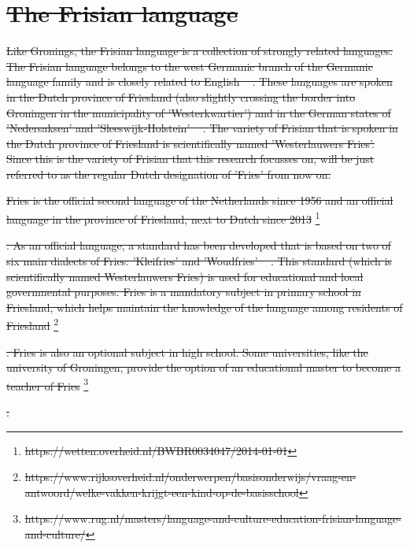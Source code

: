 \documentclass[
10pt, %
a4paper, %
oneside, %
headinclude,footinclude, %
] {book}%
\providecommand{\DIFdel}[1]{{\protect\color{red}\sout{#1}}}                      %
\begin{document}
\section{\DIFdel{The Frisian language}}
\addtocounter{section}{-1}%
\DIFdel{Like Gronings, the Frisian language is a collection of strongly related languages. The Frisian language belongs to the west Germanic branch of the Germanic language family and is closely related to English \mbox{%
\citep{streektalen}}\hspace{0pt}%
. These languages are spoken in the Dutch province of Friesland (also slightly crossing the border into Groningen in the municipality of 'Westerkwartier') and in the German states of 'Nedersaksen' and 'Sleeswijk-Holstein' \mbox{%
\citep{streektalen}}\hspace{0pt}%
. The variety of Frisian that is spoken in the Dutch province of Friesland is scientifically named 'Westerlauwers Fries'. Since this is the variety of Frisian that this research focusses on, will be just referred to as the regular Dutch designation of 'Fries' from now on. 
}%

\DIFdel{Fries is the official second language of the Netherlands since 1956 and an official language in the province of Friesland, next to Dutch since 2013 }\footnote{\DIFdel{https://wetten.overheid.nl/BWBR0034047/2014-01-01}}%
\addtocounter{footnote}{-1}%
\DIFdel{. As an official language, a standard has been developed that is based on two of six main dialects of Fries: 'Kleifries' and 'Woudfries' \mbox{%
\citep{streektalen}}\hspace{0pt}%
. This standard (which is scientifically named Westerlauwers Fries) is used for educational and local governmental purposes. Fries is a mandatory subject in primary school in Friesland, which helps maintain the knowledge of the language among residents of Friesland }\footnote{\DIFdel{https://www.rijksoverheid.nl/onderwerpen/basisonderwijs/vraag-en-antwoord/welke-vakken-krijgt-een-kind-op-de-basisschool}}%
\addtocounter{footnote}{-1}%
\DIFdel{. Fries is also an optional subject in high school. Some universities, like the university of Groningen, provide the option of an educational master to become a teacher of Fries }\footnote{\DIFdel{https://www.rug.nl/masters/language-and-culture-education-frisian-language-and-culture/}}%
\addtocounter{footnote}{-1}%
\DIFdel{. }%
\end{document}

